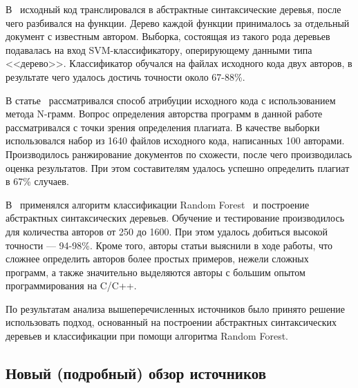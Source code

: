 В~\cite{pellin} исходный код транслировался в абстрактные синтаксические деревья, после чего разбивался на функции. Дерево каждой функции принималось за отдельный документ с известным автором. Выборка, состоящая из такого рода деревьев подавалась на вход SVM-классификатору, оперирующему данными типа <<дерево>>. Классификатор обучался на файлах исходного кода двух авторов, в результате чего удалось достичь точности около 67-88\%.

В статье~\cite{burrows} рассматривался способ атрибуции исходного кода с использованием метода N-грамм. Вопрос определения авторства программ в данной работе рассматривался с точки зрения определения плагиата. В качестве выборки использовался набор из 1640 файлов исходного кода, написанных 100 авторами. Производилось ранжирование документов по схожести, после чего производилась оценка результатов. При этом составителям удалось успешно определить плагиат в 67\% случаев.

В~\cite{caliskan} применялся алгоритм классификации Random Forest~\cite{random_forest} и построение абстрактных синтаксических деревьев. Обучение и тестирование производилось для количества авторов от 250 до 1600. При этом удалось добиться высокой точности --- 94-98\%. Кроме того, авторы статьи выяснили в ходе работы, что сложнее определить авторов более простых примеров, нежели сложных программ, а также значительно выделяются авторы с большим опытом программирования на C/C++.

По результатам анализа вышеперечисленных источников было принято решение использовать подход, основанный на построении абстрактных синтаксических деревьев и классификации при помощи алгоритма Random Forest.





\subsection{Новый (подробный) обзор источников}

